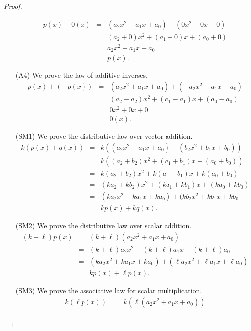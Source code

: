 \begin{proof}
\begin{itemize}
\begin{eqnarray*}
      p(x) + 0(x)  &=&  (a_2x^2 + a_1x + a_0) + (0x^2 + 0x + 0) \\
                   &=&  (a_2 + 0)x^2 + (a_1 + 0)x + (a_0 + 0)\\
                   &=&  a_2x^2 + a_1x + a_0 \\
                   &=&  p(x).
    \end{eqnarray*}
  \item[(A4)] We prove the law of additive inverses.
    \begin{eqnarray*}
      p(x) + (-p(x)) &=& (a_2x^2 + a_1x + a_0) + (- a_2x^2  - a_1x - a_0) \\
                     &=& (a_2 - a_2)x^2 + (a_1 - a_1)x + (a_0 - a_0) \\
                     &=& 0x^2 + 0x + 0 \\
                     &=& 0(x).
    \end{eqnarray*}
  \item[(SM1)] We prove the distributive law over vector addition.
    \begin{eqnarray*}
      k(p(x) + q(x)) &=& k ((a_2x^2 + a_1x + a_0) + (b_2x^2 + b_1x + b_0)) \\
                     &=& k ((a_2 + b_2)x^2 + (a_1 + b_1)x + (a_0 + b_0)) \\
                     &=& k(a_2 + b_2)x^2 + k(a_1 + b_1)x + k(a_0 + b_0) \\
                     &=& (ka_2 + kb_2)x^2 + (ka_1 + kb_1)x + (ka_0 + kb_0) \\
                     &=& (ka_2x^2 + ka_1x + ka_0) + (kb_2x^2 + kb_1x + kb_0 \\
                     &=& kp(x) + kq(x).
    \end{eqnarray*}
  \item[(SM2)] We prove the distributive law over scalar addition.
    \begin{eqnarray*}
      (k + \ell) p(x) &=& (k + \ell) (a_2x^2 + a_1x + a_0)\\
                 &=& (k + \ell)a_2x^2 + (k + \ell)a_1x + (k + \ell)a_0   \\
                 &=& (ka_2x^2 + ka_1x + ka_0) + (\ell a_2x^2 + \ell a_1x + \ell a_0)\\
                 &=& kp(x) + \ell p(x).
    \end{eqnarray*}
  \item[(SM3)] We prove the associative law for scalar multiplication.
    \begin{eqnarray*}
      k(\ell p(x)) &=& k(\ell(a_2x^2 + a_1x + a_0)) \\

\end{eqnarray*}
\end{itemize}
\end{proof}
